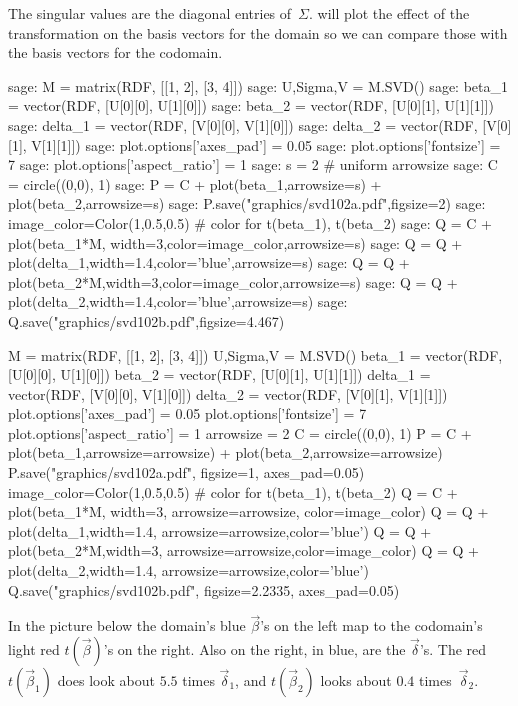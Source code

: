 The singular values are the diagonal entries of~$\Sigma$.
\Sage{} will plot the effect of the transformation
on the basis vectors for the domain so we can compare those with the
basis vectors for the codomain.
\begin{sagecommandline}
sage: M = matrix(RDF, [[1, 2], [3, 4]])
sage: U,Sigma,V = M.SVD()
sage: beta_1 = vector(RDF, [U[0][0], U[1][0]])
sage: beta_2 = vector(RDF, [U[0][1], U[1][1]])
sage: delta_1 = vector(RDF, [V[0][0], V[1][0]])
sage: delta_2 = vector(RDF, [V[0][1], V[1][1]])
sage: plot.options['axes_pad'] = 0.05
sage: plot.options['fontsize'] = 7
sage: plot.options['aspect_ratio'] = 1
sage: s = 2  # uniform arrowsize
sage: C = circle((0,0), 1)
sage: P = C + plot(beta_1,arrowsize=s) + plot(beta_2,arrowsize=s)
sage: P.save("graphics/svd102a.pdf",figsize=2)
sage: image_color=Color(1,0.5,0.5)   # color for t(beta_1), t(beta_2)
sage: Q = C + plot(beta_1*M, width=3,color=image_color,arrowsize=s) 
sage: Q = Q + plot(delta_1,width=1.4,color='blue',arrowsize=s) 
sage: Q = Q + plot(beta_2*M,width=3,color=image_color,arrowsize=s) 
sage: Q = Q + plot(delta_2,width=1.4,color='blue',arrowsize=s)
sage: Q.save("graphics/svd102b.pdf",figsize=4.467)
\end{sagecommandline}
\begin{sagesilent}
M = matrix(RDF, [[1, 2], [3, 4]])
U,Sigma,V = M.SVD()
beta_1 = vector(RDF, [U[0][0], U[1][0]])
beta_2 = vector(RDF, [U[0][1], U[1][1]])
delta_1 = vector(RDF, [V[0][0], V[1][0]])
delta_2 = vector(RDF, [V[0][1], V[1][1]])
plot.options['axes_pad'] = 0.05
plot.options['fontsize'] = 7
plot.options['aspect_ratio'] = 1
arrowsize = 2
C = circle((0,0), 1)
P = C + plot(beta_1,arrowsize=arrowsize) + plot(beta_2,arrowsize=arrowsize)
P.save("graphics/svd102a.pdf", figsize=1, axes_pad=0.05)
image_color=Color(1,0.5,0.5)   # color for t(beta_1), t(beta_2)
Q = C + plot(beta_1*M, width=3, arrowsize=arrowsize, color=image_color) 
Q = Q + plot(delta_1,width=1.4, arrowsize=arrowsize,color='blue') 
Q = Q + plot(beta_2*M,width=3, arrowsize=arrowsize,color=image_color) 
Q = Q + plot(delta_2,width=1.4, arrowsize=arrowsize,color='blue')
Q.save("graphics/svd102b.pdf", figsize=2.2335, axes_pad=0.05)
\end{sagesilent}
In the picture below the domain's 
blue $\vec{\beta}$'s on the left map to the codomain's light red 
$t(\vec{\beta})$'s on the right.
Also on the right, in blue, are the $\vec{\delta}$'s.
The red $t(\vec{\beta}_1)$ does look about $5.5$ times $\vec{\delta}_1$,
and $t(\vec{\beta}_2)$ looks about $0.4$ times~$\vec{\delta}_2$. 
